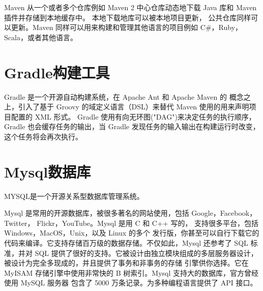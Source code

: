 Maven 从一个或者多个仓库例如 Maven 2 中心仓库动态地下载 Java 库和 Maven 插件并存储到本地缓存中。 本地下载地库可以被本地项目更新，
公共仓库同样可以更新。Maven 同样可以用来构建和管理其他语言的项目例如 C\#，Ruby，Scala，或者其他语言。

\section{Gradle构建工具}
Gradle\cite{Gradle} 是一个开源自动构建系统，在 Apache Ant 和 Apache Maven 的
概念之上，引入了基于 Groovy 的域定义语言（DSL）来替代 Maven 使用的用来声明项目配置的 XML 形式。
Gradle 使用有向无环图("DAG")来决定任务的执行顺序，Gradle 也会缓存任务的输出，当 Gradle 发现任务的输入输出在构建运行时改变，这个任务将会再次执行。




\section{Mysql数据库}
MYSQL\cite{WikiMysql}是一个开源关系型数据库管理系统。

Mysql 是常用的开源数据库，被很多著名的网站使用，包括 Google，Facebook，Twitter，
Flickr，YouTube。Mysql 是用 C 和 C++ 写的， 支持很多平台，包括 Windows，MacOS，Unix，以及 Linux 的多个
发行版，你甚至可以自行下载它的代码来编译。它支持存储百万级的数据存储。不仅如此，Mysql 还参考了 SQL 标准，并对 SQL 
提供了很好的支持。它被设计由独立模块组成的多层服务器设计，被设计为完全多现成的，并且提供了事务和非事务的存储
引擎供你选择。它在 MyISAM 存储引擎中使用非常快的 B 树索引。Mysql 支持大的数据库，官方曾经使用 MySQL 服务器
包含了 5000 万条记录。为多种编程语言提供了 API 接口\cite{MysqlMainFeature}。

